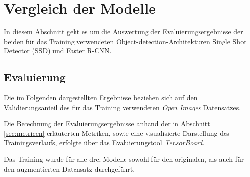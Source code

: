 \section{Vergleich der Modelle}\label{sec:model_vergleich}

In diesem Abschnitt geht es um die Auswertung 
der Evaluierungsergebnisse der beiden für das Training 
verwendeten Object-detection-Architekturen Single
Shot Detector (SSD) und Faster R-CNN.


\subsection{Evaluierung}

Die im Folgenden dargestellten Ergebnisse beziehen sich auf 
den Validierungsanteil des für das Training verwendeten
\textit{Open Images} Datensatzes.

Die Berechnung der Evaluierungsergebnisse
anhand der in Abschnitt
\ref{sec:metricen} erläuterten Metriken, sowie 
eine visualisierte Darstellung 
des Trainingsverlaufs, erfolgte
über das Evaluierungstool \textit{TensorBoard}.

Das Training wurde für alle drei Modelle
sowohl für den originalen, als auch für den
augmentierten Datensatz durchgeführt.

